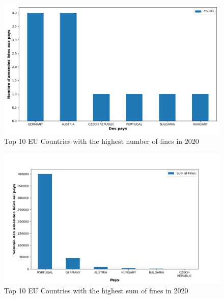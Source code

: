\documentclass[12pt]{article}
\begin{document}
	\begin{figure}
		[H]\centering\includegraphics[scale=.5]{graphs/top10_countries_year}
		\caption{Top 10 EU Countries with the highest number of fines in 2020}
	\end{figure}
	\begin{figure}
		[H]\centering\includegraphics[scale=.5]{graphs/top10_countries_year_fines}
		\caption{Top 10 EU Countries with the highest sum of fines in 2020}
	\end{figure}
\end{document}
